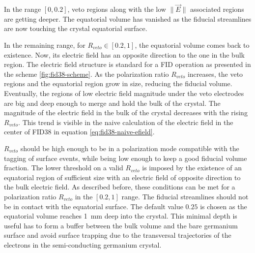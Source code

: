 In the range $[0, 0.2]$, veto regions along with the low $\|\vec{E}\|$ associated regions are getting deeper. The equatorial volume has vanished as the fiducial streamlines are now touching the crystal equatorial surface. 

In the remaining range, for $R_{veto} \in [0.2, 1]$, the equatorial volume comes back to existence. Now, its electric field has an opposite direction to the one in the bulk region. The electric field structure is standard for a FID operation as presented in the scheme \ref{fig:fid38-scheme}. As the polarization ratio $R_{veto}$ increases, the veto regions and the equatorial region grow in size, reducing the fiducial volume. Eventually, the regions of low electric field magnitude under the veto electrodes are big and deep enough to merge and hold the bulk of the crystal.
The magnitude of the electric field in the bulk of the crystal decreases with the rising $R_{veto}$. This trend is visible in the naive calculation of the electric field in the center of FID38 in equation \ref{eq:fid38-naive-efield}.


$R_{veto}$ should be high enough to be in a polarization mode compatible with the tagging of surface events, while being low enough to keep a good fiducial volume fraction. The lower threshold on a valid $R_{veto}$ is imposed by the existence of an equatorial region of sufficient size with an electric field of opposite direction to the bulk electric field. As described before, these conditions can be met for a polarization ratio $R_{veto}$ in the $[0.2, 1]$ range. The fiducial streamlines should not be in contact with the equatorial surface. The default value $0.25$ is chosen as the equatorial volume reaches \SI{1}{\mm} deep into the crystal. This minimal depth is useful has to form a buffer between the bulk volume and the bare germanium surface and avoid surface trapping due to the transversal trajectories of the electrons in the semi-conducting germanium crystal.

